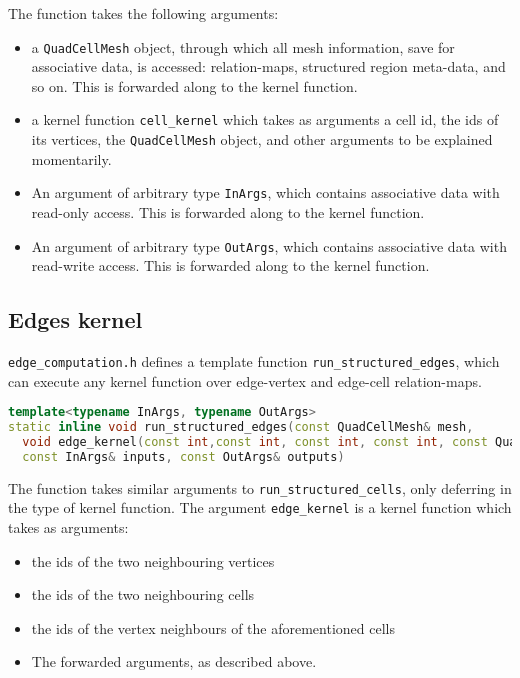 The function takes the following arguments:
\begin{itemize}
\item a \lstinline|QuadCellMesh| object, through which all mesh information, save for associative data, is accessed: relation-maps, structured region meta-data, and so on. This is forwarded along to the kernel function.
\item a kernel function \lstinline|cell_kernel| which takes as arguments a cell id, the ids of its vertices, the \lstinline|QuadCellMesh| object, and other arguments to be explained momentarily.
\item An argument of arbitrary type \lstinline|InArgs|, which contains associative data with read-only access. This is forwarded along to the kernel function.
\item An argument of arbitrary type \lstinline|OutArgs|, which contains associative data with read-write access. This is forwarded along to the kernel function.
\end{itemize}


\subsection{Edges kernel}
\texttt{edge\_computation.h} defines a template function \lstinline|run_structured_edges|, which can execute any kernel function over edge-vertex and edge-cell relation-maps.

\begin{lstlisting}[language=c++]
template<typename InArgs, typename OutArgs>
static inline void run_structured_edges(const QuadCellMesh& mesh,
  void edge_kernel(const int,const int, const int, const int, const QuadNeighbours&, const QuadNeighbours&, const int, const QuadCellMesh&, const InArgs&, const OutArgs&),
  const InArgs& inputs, const OutArgs& outputs)
\end{lstlisting}

The function takes similar arguments to \lstinline|run_structured_cells|, only deferring in the type of kernel function. The argument \lstinline|edge_kernel| is a kernel function which takes as arguments:
\begin{itemize}
\item the ids of the two neighbouring vertices
\item the ids of the two neighbouring cells
\item the ids of the vertex neighbours of the aforementioned cells
\item The forwarded arguments, as described above.
\end{itemize}


